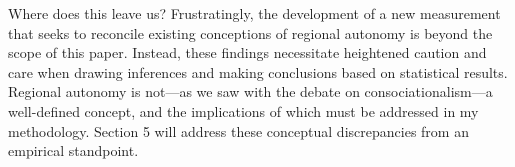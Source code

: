 \documentclass[12pt]{article}
\begin{document}
Where does this leave us? Frustratingly, the development of a new measurement that seeks to reconcile existing conceptions of regional autonomy is beyond the scope of this paper. Instead, these findings necessitate heightened caution and care when drawing inferences and making conclusions based on statistical results. Regional autonomy is not---as we saw with the debate on consociationalism---a well-defined concept, and the implications of which must be addressed in my methodology. Section 5 will address these conceptual discrepancies from an empirical standpoint. 

\begin{table}[ht]
	\centering
	\setlength{\tabcolsep}{4pt}
	\renewcommand{\arraystretch}{1.5} 
\caption{Pearson's Correlation of Segmental Autonomy and Authority Measurements}
\end{table}
\end{document}
